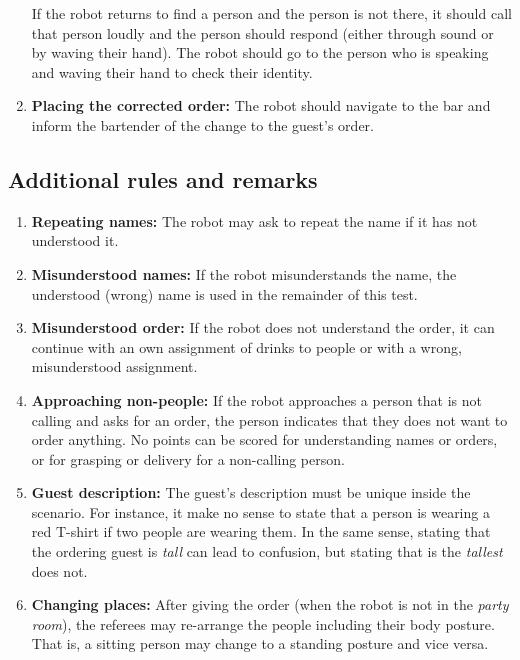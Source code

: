 \begin{enumerate}
	If the robot returns to find a person and the person is not there, it should call that person loudly and the person should respond (either through sound or by waving their hand). The robot should go to the person who is speaking and waving their hand to check their identity.

	\item \textbf{Placing the corrected order:} The robot should navigate to the bar and inform the bartender of the change to the guest's order.
\end{enumerate}

\subsection{Additional rules and remarks}
\begin{enumerate}
	\item \textbf{Repeating names:} The robot may ask to repeat the name if it has not understood it.

	\item \textbf{Misunderstood names:} If the robot misunderstands the name, the understood (wrong) name is used in the remainder of this test.

	\item \textbf{Misunderstood order:} If the robot does not understand the order, it can continue with an own assignment of drinks to people or with a wrong, misunderstood assignment.

	\item \textbf{Approaching non-people:} If the robot approaches a person that is not calling and asks for an order, the person indicates that they does not want to order anything. No points can be scored for understanding names or orders, or for grasping or delivery for a non-calling person.

	\item \textbf{Guest description:} The guest's description must be unique inside the scenario. For instance, it make no sense to state that a person is wearing a red T-shirt if two people are wearing them. In the same sense, stating that the ordering guest is \textit{tall} can lead to confusion, but stating that is the \textit{tallest} does not.

	\item \textbf{Changing places:} After giving the order (when the robot is not in the \textit{party room}), the referees may re-arrange the people including their body posture. That is, a sitting person may change to a standing posture and vice versa.


\end{enumerate}
